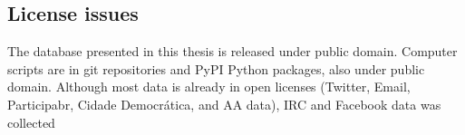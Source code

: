 																																																																																																																																																																																																																																																																																																																																																																																																																																																																																																																																																			\subsection{License issues}
																																																																																																																																																																																																																																																																																																																																																																																																																																																																																																																																																			The database presented in this thesis is released under public domain.
																																																																																																																																																																																																																																																																																																																																																																																																																																																																																																																																																			Computer scripts are in git repositories and PyPI Python packages, also under public domain.
																																																																																																																																																																																																																																																																																																																																																																																																																																																																																																																																																			Although most data is already in open licenses (Twitter, Email, Participabr, Cidade Democrática, and AA data), IRC and Facebook data was collected
